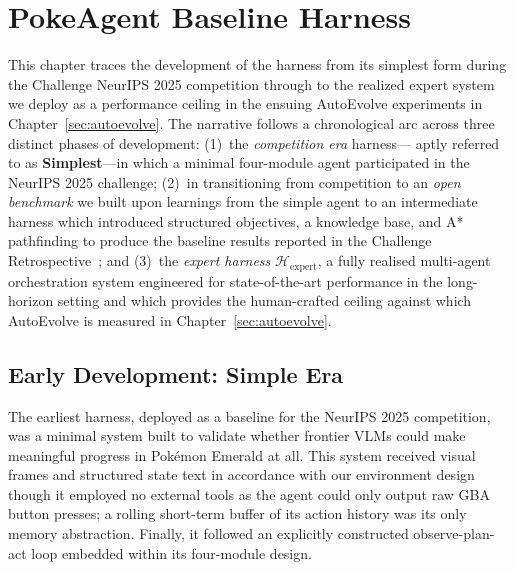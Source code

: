 
\newpage
\section{PokeAgent Baseline Harness}\label{sec:pokeagent}

This chapter traces the development of the \pokeagent{} harness from its simplest form during the \pokeagent{} Challenge NeurIPS 2025 competition through to the realized expert system we deploy as a performance ceiling in the ensuing AutoEvolve experiments in Chapter~\ref{sec:autoevolve}. The narrative follows a chronological arc across three distinct phases of development: (1)~the \emph{competition era} harness--- aptly referred to as \textbf{\pokeagent{} Simplest}---in which a minimal four-module agent participated in the NeurIPS 2025 challenge; (2)~in transitioning from competition to an \emph{open benchmark} we built upon learnings from the simple agent to an intermediate harness which introduced structured objectives, a knowledge base, and A* pathfinding to produce the baseline results reported in the \pokeagent{} Challenge Retrospective~\citep{karten2025pokeagent}; and (3)~the \emph{expert harness} $\mathcal{H}_{\text{expert}}$, a fully realised multi-agent orchestration system engineered for state-of-the-art performance in the long-horizon setting and which provides the human-crafted ceiling against which AutoEvolve is measured in Chapter~\ref{sec:autoevolve}.


\subsection{Early Development: \pokeagent{} Simple Era}\label{sec:early_development}

The earliest \pokeagent{} harness, deployed as a baseline for the NeurIPS 2025 competition, was a minimal system built to validate whether frontier VLMs could make meaningful progress in Pok\'{e}mon Emerald at all. This system received visual frames and structured state text in accordance with our environment design though it employed no external tools as the agent could only output raw GBA button presses; a rolling short-term buffer of its action history was its only memory abstraction. Finally, it followed an explicitly constructed observe-plan-act loop embedded within its four-module design.

